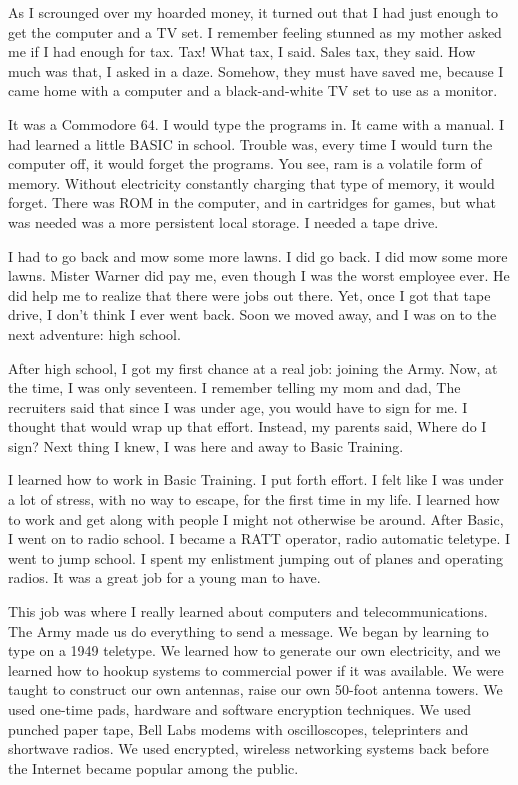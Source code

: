 As I scrounged over my hoarded money, it turned out that I had just enough to get the computer and a TV set.  I remember feeling stunned as my mother asked me if I had enough for tax.  Tax! What tax, I said.  Sales tax, they said.  How much was that, I asked in a daze.  Somehow, they must have saved me, because I came home with a computer and a black-and-white TV set to use as a monitor.

It was a Commodore 64.  I would type the programs in.   It came with a manual.  I had learned a little BASIC in school.  Trouble was, every time I would turn the computer off, it would forget the programs.  You see, \gls{ram} is a volatile form of memory.  Without electricity constantly charging that type of memory, it would forget.  There was ROM in the computer, and in cartridges for games, but what was needed was a more persistent local storage.  I needed a tape drive.

I had to go back and mow some more lawns.  I did go back.  I did mow some more lawns. Mister Warner did pay me, even though I was the worst employee ever.  He did help me to realize that there were jobs out there.  Yet, once I got that tape drive, I don't think I ever went back.  Soon we moved away, and I was on to the next adventure:  high school.

After high school, I got my first chance at a real job:  joining the Army.  Now, at the time, I was only seventeen.  I remember telling my mom and dad, The recruiters said that since I was under age, you would have to sign for me.  I thought that would wrap up that effort.  Instead, my parents said, Where do I sign?  Next thing I knew, I was here and away to Basic Training.

I learned how to work in Basic Training.  I put forth effort.  I felt like I was under a lot of stress, with no way to escape, for the first time in my life.  I learned how to work and get along with people I might not otherwise be around.  After Basic, I went on to radio school.  I became a RATT operator, radio automatic teletype.  I went to jump school.  I spent my enlistment jumping out of planes and operating radios.  It was a great job for a young man to have.

This job was where I really learned about computers and telecommunications.  The Army made us do everything to send a message.  We began by learning to type on a 1949 teletype.  We learned how to generate our own electricity, and we learned how to hookup systems to commercial power if it was available.  We were taught to construct our own antennas, raise our own 50-foot antenna towers.  We used one-time pads, hardware and software \gls{encrypt}ion techniques.  We used punched paper tape, Bell Labs modems with oscilloscopes, teleprinters and shortwave radios.  We used \gls{encrypt}ed, wireless networking systems back before the Internet became popular among the public.


